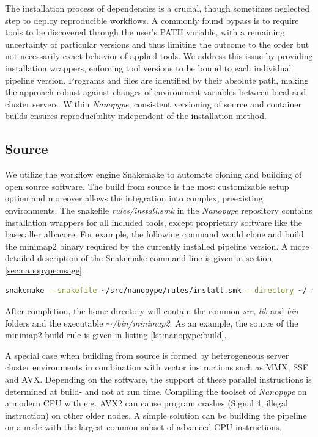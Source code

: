The installation process of dependencies is a crucial, though sometimes neglected step to deploy reproducible workflows. A commonly found bypass is to require tools to be discovered through the user's PATH variable, with a remaining uncertainty of particular versions and thus limiting the outcome to the order but not necessarily exact behavior of applied tools. We address this issue by providing installation wrappers, enforcing tool versions to be bound to each individual pipeline version. Programs and files are identified by their absolute path, making the approach robust against changes of environment variables between local and cluster servers. Within \textit{Nanopype}, consistent versioning of source and container builds ensures reproducibility independent of the installation method.


\subsection{Source}

We utilize the workflow engine Snakemake to automate cloning and building of open source software. The build from source is the most customizable setup option and moreover allows the integration into complex, preexisting environments. The snakefile \textit{rules/install.smk} in the \textit{Nanopype} repository contains installation wrappers for all included tools, except proprietary software like the basecaller albacore. For example, the following command would clone and build the minimap2 binary required by the currently installed pipeline version. A more detailed description of the Snakemake command line is given in section \ref{sec:nanopype:usage}.

\begin{lstlisting}[language=sh, caption=Snakemake tool installation example]
snakemake --snakefile ~/src/nanopype/rules/install.smk --directory ~/ minimap2
\end{lstlisting}

After completion, the home directory will contain the common \textit{src}, \textit{lib} and \textit{bin} folders and the executable $\sim$\textit{/bin/minimap2}. As an example, the source of the minimap2 build rule is given in listing \ref{lst:nanopype:build}.

A special case when building from source is formed by heterogeneous server cluster environments in combination with vector instructions such as MMX, SSE and AVX. Depending on the software, the support of these parallel instructions is determined at build- and not at run time. Compiling the toolset of \textit{Nanopype} on a modern CPU with e.g. AVX2 can cause program crashes (Signal 4, illegal instruction) on other older nodes. A simple solution can be building the pipeline on a node with the largest common subset of advanced CPU instructions.



